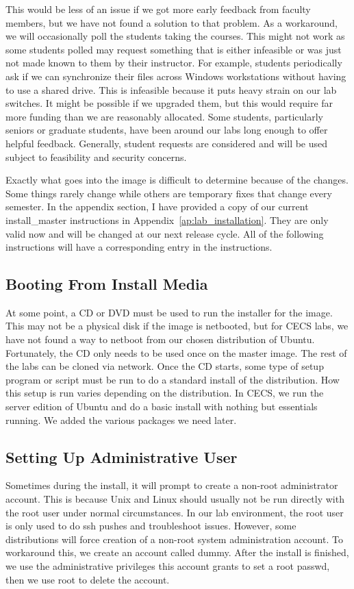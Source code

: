 This would be less of an issue if we got more early feedback from faculty members, but we have not found a solution to that problem.  As a workaround, we will occasionally poll the students taking the courses.  This might not work as some students polled may request something that is either infeasible or was just not made known to them by their instructor.  For example, students periodically ask if we can synchronize their files across Windows workstations without having to use a shared drive.  This is infeasible because it puts heavy strain on our lab switches.  It might be possible if we upgraded them, but this would require far more funding than we are reasonably allocated.  Some students, particularly seniors or graduate students, have been around our labs long enough to offer helpful feedback.  Generally, student requests are considered and will be used subject to feasibility and security concerns. 

Exactly what goes into the image is difficult to determine because of the changes.  Some things rarely change while others are temporary fixes that change every semester.  In the appendix section, I have provided a copy of our current install\_master instructions in Appendix~\ref{ap:lab_installation}.  They are only valid now and will be changed at our next release cycle.  All of the following instructions will have a corresponding entry in the instructions. 

\subsection{Booting From Install Media}
At some point, a CD or DVD must be used to run the installer for the image.  This may not be a physical disk if the image is netbooted, but for CECS labs, we have not found a way to netboot from our chosen distribution of Ubuntu.  Fortunately, the CD only needs to be used once on the master image.  The rest of the labs can be cloned via network.  Once the CD starts, some type of setup program or script must be run to do a standard install of the distribution.  How this setup is run varies depending on the distribution.  In CECS, we run the server edition of Ubuntu and do a basic install with nothing but essentials running.  We added the various packages we need later.  

\subsection{Setting Up Administrative User}
Sometimes during the install, it will prompt to create a non-root administrator account.  This is because Unix and Linux should usually not be run directly with the root user under normal circumstances.  In our lab environment, the root user is only used to do ssh pushes and troubleshoot issues.  However, some distributions will force creation of a non-root system administration account.  To workaround this, we create an account called dummy.  After the install is finished, we use the administrative privileges this account grants to set a root passwd, then we use root to delete the account.  

